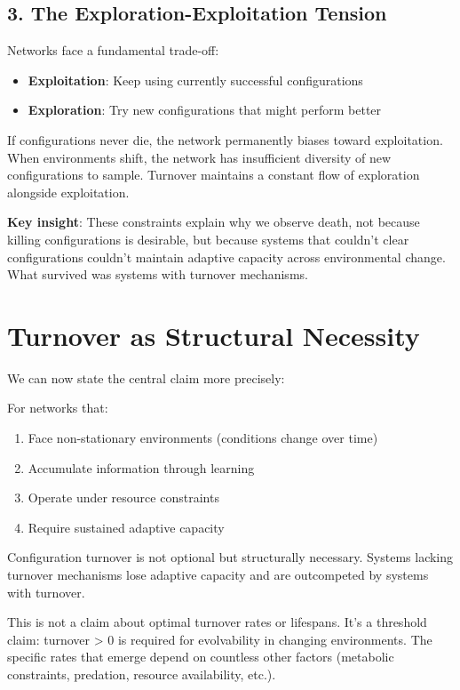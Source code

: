 \subsection{3. The Exploration-Exploitation Tension}

Networks face a fundamental trade-off:
\begin{itemize}
    \item \textbf{Exploitation}: Keep using currently successful configurations
    \item \textbf{Exploration}: Try new configurations that might perform better
\end{itemize}

If configurations never die, the network permanently biases toward exploitation. When environments shift, the network has insufficient diversity of new configurations to sample. Turnover maintains a constant flow of exploration alongside exploitation.

\textbf{Key insight}: These constraints explain why we observe death, not because killing configurations is desirable, but because systems that couldn't clear configurations couldn't maintain adaptive capacity across environmental change. What survived was systems with turnover mechanisms.

\section{Turnover as Structural Necessity}

We can now state the central claim more precisely:

\begin{principle}
For networks that:
\begin{enumerate}
    \item Face non-stationary environments (conditions change over time)
    \item Accumulate information through learning
    \item Operate under resource constraints
    \item Require sustained adaptive capacity
\end{enumerate}
Configuration turnover is not optional but structurally necessary. Systems lacking turnover mechanisms lose adaptive capacity and are outcompeted by systems with turnover.
\end{principle}

This is not a claim about optimal turnover rates or lifespans. It's a threshold claim: turnover > 0 is required for evolvability in changing environments. The specific rates that emerge depend on countless other factors (metabolic constraints, predation, resource availability, etc.).

